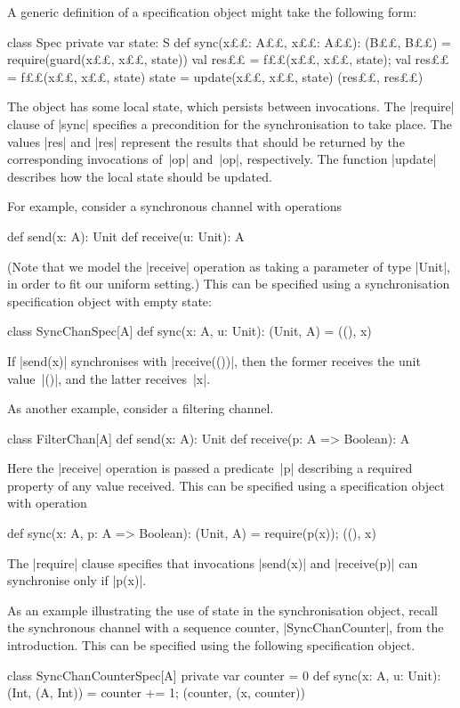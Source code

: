 A generic definition of a specification object might take the following form: 
%
\begin{scala}
class Spec{
  private var state: S
  def sync(x££: A££, x££: A££): (B££, B££) = {
    require(guard(x££, x££, state))
    val res££ = f££(x££, x££, state); val res££ = f££(x££, x££, state)
    state = update(x££, x££, state)
    (res££, res££)
  }
}
\end{scala}
%
The object has some local state, which persists between invocations.  The
|require| clause of |sync| specifies a precondition for the synchronisation to
take place.  The values |res| and |res| represent the results that
should be returned by the corresponding invocations of~|op| and~|op|,
respectively.  The function |update| describes how the local state should be
updated. 

For example, consider a synchronous channel with operations
\begin{scala}
  def send(x: A): Unit
  def receive(u: Unit): A
\end{scala}
%
(Note that we model the |receive| operation as taking a parameter of type
|Unit|, in order to fit our uniform setting.) 
%
This can be specified using a synchronisation specification object
with empty state:
%
\begin{scala}
class SyncChanSpec[A]{
  def sync(x: A, u: Unit): (Unit, A) = ((), x)
}
\end{scala}
%
If |send(x)| synchronises with |receive(())|, then the former receives the
unit value~|()|, and the latter receives~|x|. 

As another example, consider a filtering channel.
\begin{scala}
class FilterChan[A]{
  def send(x: A): Unit
  def receive(p: A => Boolean): A
}
\end{scala}
%
Here the |receive| operation is passed a predicate~|p| describing a required
property of any value received.  This can be specified using a specification
object with operation
%
\begin{scala}
  def sync(x: A, p: A => Boolean): (Unit, A) = { require(p(x)); ((), x) }
\end{scala}
%
The |require| clause specifies that invocations |send(x)| and |receive(p)| can
synchronise only if |p(x)|.

As an example illustrating the use of state in the synchronisation object,
recall the synchronous channel with a sequence counter, |SyncChanCounter|,
from the introduction.  This can be specified using the following
specification object.
%
\begin{scala}
class SyncChanCounterSpec[A]{
  private var counter = 0
  def sync(x: A, u: Unit): (Int, (A, Int)) = {
    counter += 1; (counter, (x, counter))
  }
}
\end{scala}

